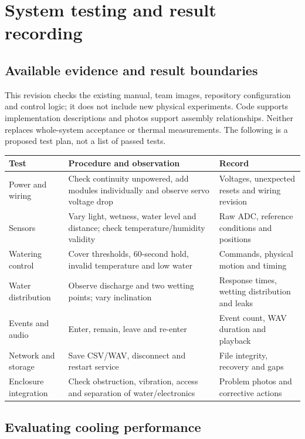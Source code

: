 \documentclass[10pt,a4paper]{article}
\begin{document}
\section{System testing and result recording}

\subsection{Available evidence and result boundaries}

This revision checks the existing manual, team images, repository configuration and control logic; it does not include new physical experiments. Code supports implementation descriptions and photos support assembly relationships. Neither replaces whole-system acceptance or thermal measurements. The following is a proposed test plan, not a list of passed tests.


\begin{longtable}{>{\raggedright\arraybackslash}p{42mm}>{\raggedright\arraybackslash}p{59mm}>{\raggedright\arraybackslash}p{58mm}}
\toprule
\textbf{Test} & \textbf{Procedure and observation} & \textbf{Record}\\\midrule\endhead
Power and wiring & Check continuity unpowered, add modules individually and observe servo voltage drop & Voltages, unexpected resets and wiring revision\\
Sensors & Vary light, wetness, water level and distance; check temperature/humidity validity & Raw ADC, reference conditions and positions\\
Watering control & Cover thresholds, 60-second hold, invalid temperature and low water & Commands, physical motion and timing\\
Water distribution & Observe discharge and two wetting points; vary inclination & Response times, wetting distribution and leaks\\
Events and audio & Enter, remain, leave and re-enter & Event count, WAV duration and playback\\
Network and storage & Save CSV/WAV, disconnect and restart service & File integrity, recovery and gaps\\
Enclosure integration & Check obstruction, vibration, access and separation of water/electronics & Problem photos and corrective actions\\
\bottomrule\end{longtable}

\subsection{Evaluating cooling performance}
\end{document}
